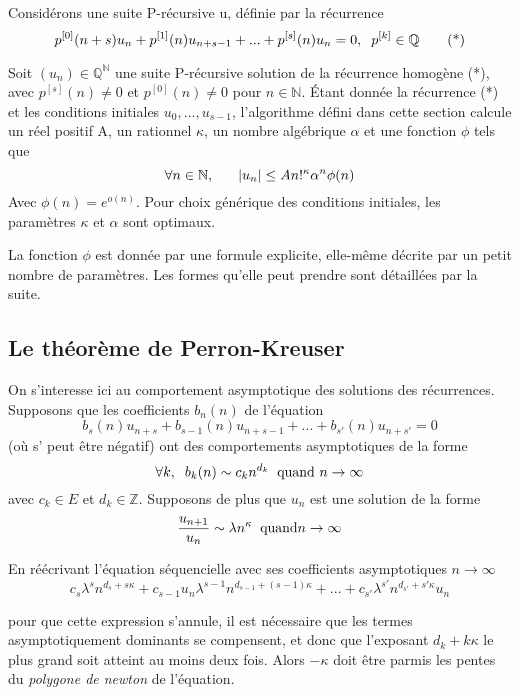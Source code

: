 \documentclass[a4paper,10.5pt]{article}
\begin{document}
	Considérons une suite P-récursive u, définie par la récurrence
	\[p^{[0]}(n+s)u_{n}+p^{[1]}(n)u_{n+s-1}+...+p^{[s]}(n)u_{n}=0,\hspace{2mm} p^{[k]}\in \mathbb{Q} \tag{*}\] 
	\begin{theorem}Soit $(u_{n})\in \mathbb{Q}^{\mathbb{N}}$ une suite P-récursive solution de la récurrence homogène (*), avec $p^{[s]}(n) \neq 0$ et $p^{[0]}(n) \neq 0$ pour $n \in \mathbb{N}$. Étant donnée la récurrence (*) et les conditions initiales $u_{0},...,u_{s-1}$, l'algorithme défini dans cette section calcule un réel positif A, un rationnel $\kappa$, un nombre algébrique $\alpha$  et une fonction $\phi$ tels que
		\[\forall n\in \mathbb{N}, \hspace{6mm}|u_{n}| \leq A n!^{\kappa}\alpha^{n}\phi(n)\]
		Avec $\phi(n)=e^{o(n)}$. Pour choix générique des conditions initiales, les paramètres $\kappa$ et $\alpha$ sont optimaux.
	\end{theorem}
	
	La fonction $\phi$ est donnée par une formule explicite, elle-même décrite par un petit nombre de paramètres. Les formes qu'elle peut prendre sont détaillées par la suite.
	
	\subsection{Le théorème de Perron-Kreuser}
	
	On s'interesse ici au comportement asymptotique des solutions des récurrences. Supposons que les coefficients $b_{n}(n)$ de l'équation
	\[b_{s}(n)u_{n+s}+b_{s-1}(n)u_{n+s-1}+...+b_{s'}(n)u_{n+s'}=0  \tag{*}\]
	(où s' peut être négatif) ont des comportements asymptotiques de la forme
	\[\forall k, \hspace{2mm} b_{k}(n) \sim c_{k}n^{d_{k}} \hspace{2mm} \text{quand } n \rightarrow \infty\]
	avec $c_{k} \in E$ et $d_{k} \in \mathbb{Z}$. Supposons de plus que $u_{n}$ est une solution de la forme  
	\[\frac{u_{n+1}}{u_{n}}\sim \lambda n^{\kappa} \hspace{2mm} \text{quand}n \rightarrow \infty\]
	
	\noindent En réécrivant l'équation séquencielle avec ses coefficients asymptotiques $n \rightarrow \infty$
	\[c_{s}\lambda^{s} n^{d_{s}+s\kappa}+c_{s-1}u_{n}\lambda^{s-1} n^{d_{s-1}+(s-1)\kappa}+...+c_{s'}\lambda^{s'} n^{d_{s'}+s'\kappa}u_{n}\]
	
	pour que cette expression s'annule, il est nécessaire que les termes asymptotiquement dominants se compensent, et donc que l'exposant $d_{k}+k\kappa$ le plus grand soit atteint au moins deux fois. Alors $-\kappa$ doit être parmis les pentes du \textit{polygone de newton} de l'équation.
	
\end{document}
